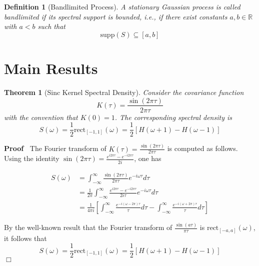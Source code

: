 \documentclass{article}
\newenvironment{proof}{\noindent\textbf{Proof\ }}{\hspace*{\fill}$\Box$\medskip}
\newtheorem{definition}{Definition}
{\theorembodyfont{\rmfamily}\newtheorem{example}{Example}}
\newtheorem{theorem}{Theorem}
\begin{document}
\begin{definition}
  [Bandlimited Process] A stationary Gaussian process is called bandlimited if
  its spectral support is bounded, i.e., if there exist constants $a, b \in
  \mathbb{R}$ with $a < b$ such that
  \begin{equation}
    \mathrm{supp} (S) \subseteq [a, b]
  \end{equation}
\end{definition}

\section{Main Results}

\begin{theorem}
  [Sinc Kernel Spectral Density] Consider the covariance function
  \begin{equation}
    K (\tau) = \frac{\sin (2 \pi \tau)}{2 \pi \tau}
  \end{equation}
  with the convention that $K (0) = 1$. The corresponding spectral density is
  \begin{equation}
    S (\omega) = \frac{1}{2} \mathrm{rect}_{[- 1, 1]} (\omega) = \frac{1}{2} 
    [H (\omega + 1) - H (\omega - 1)]
  \end{equation}
\end{theorem}

\begin{proof}
  The Fourier transform of $K (\tau) = \frac{\sin (2 \pi \tau)}{2 \pi \tau}$
  is computed as follows. Using the identity $\sin (2 \pi \tau) = \frac{e^{i 2
  \pi \tau} - e^{- i 2 \pi \tau}}{2 i}$, one has
  
  \begin{align}
    S (\omega) & = \int_{- \infty}^{\infty} \frac{\sin (2 \pi \tau)}{2 \pi
    \tau} e^{- i \omega \tau} d \tau \\
    & = \frac{1}{2 \pi}  \int_{- \infty}^{\infty} \frac{e^{i 2 \pi \tau} -
    e^{- i 2 \pi \tau}}{2 i \tau} e^{- i \omega \tau} d \tau \\
    & = \frac{1}{4 \pi i}  \left[ \int_{- \infty}^{\infty} \frac{e^{- i
    (\omega - 2 \pi) \tau}}{\tau} d \tau - \int_{- \infty}^{\infty} \frac{e^{-
    i (\omega + 2 \pi) \tau}}{\tau} d \tau \right] 
  \end{align}
  
  By the well-known result that the Fourier transform of $\frac{\sin (a
  \tau)}{\pi \tau}$ is $\mathrm{rect}_{[- a, a]} (\omega)$, it follows that
  \begin{equation}
    S (\omega) = \frac{1}{2} \mathrm{rect}_{[- 1, 1]} (\omega) = \frac{1}{2} 
    [H (\omega + 1) - H (\omega - 1)]
  \end{equation}
\end{proof}
\end{document}

